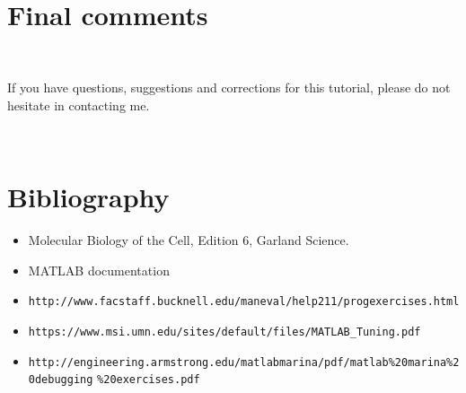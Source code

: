 \documentclass[11pt]{amsart}
\begin{document}
\

\section{Final comments}

\

If you have questions, suggestions and corrections for this tutorial, please do not hesitate in contacting me.

\


\section{Bibliography}
\begin{itemize}
\item Molecular Biology of the Cell, Edition 6, Garland Science.
\item MATLAB documentation
\item \verb+http://www.facstaff.bucknell.edu/maneval/help211/progexercises.html+
\item \verb+https://www.msi.umn.edu/sites/default/files/MATLAB_Tuning.pdf+
\item \verb+http://engineering.armstrong.edu/matlabmarina/pdf/matlab%20marina%20debugging+
\verb+%20exercises.pdf+
\end{itemize}
\end{document}
